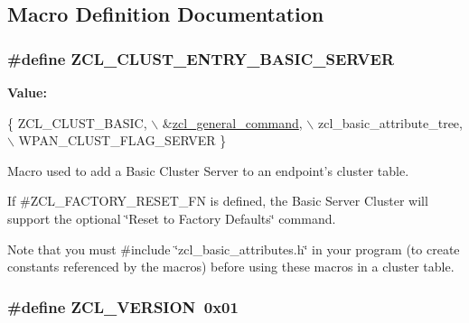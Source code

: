 \subsection{Macro Definition Documentation}
\hypertarget{group__zcl__basic_gad8336fcfc2729c8deb86eda7f125f271}{
\subsubsection[{Z\-C\-L\-\_\-\-C\-L\-U\-S\-T\-\_\-\-E\-N\-T\-R\-Y\-\_\-\-B\-A\-S\-I\-C\-\_\-\-S\-E\-R\-V\-E\-R}]{\setlength{\rightskip}{0pt plus 5cm}\#define Z\-C\-L\-\_\-\-C\-L\-U\-S\-T\-\_\-\-E\-N\-T\-R\-Y\-\_\-\-B\-A\-S\-I\-C\-\_\-\-S\-E\-R\-V\-E\-R}}\label{group__zcl__basic_gad8336fcfc2729c8deb86eda7f125f271}
{\bfseries Value\-:}
\begin{DoxyCode}
\{ ZCL\_CLUST\_BASIC,                  \(\backslash\)
         &\hyperlink{group__zcl_gac3849121e93e777ce9a7510d24517b9b}{zcl\_general\_command},           \(\backslash\)
         zcl\_basic\_attribute\_tree,        \(\backslash\)
         WPAN\_CLUST\_FLAG\_SERVER \}
\end{DoxyCode}


Macro used to add a Basic Cluster Server to an endpoint's cluster table. 

If \#\-Z\-C\-L\-\_\-\-F\-A\-C\-T\-O\-R\-Y\-\_\-\-R\-E\-S\-E\-T\-\_\-\-F\-N is defined, the Basic Server Cluster will support the optional \char`\"{}\-Reset to Factory Defaults\char`\"{} command.

Note that you must \#include \char`\"{}zcl\-\_\-basic\-\_\-attributes.\-h\char`\"{} in your program (to create constants referenced by the macros) before using these macros in a cluster table. \hypertarget{group__zcl__basic_ga677e87e13981dedcd3b370ede4902c54}{
\subsubsection[{Z\-C\-L\-\_\-\-V\-E\-R\-S\-I\-O\-N}]{\setlength{\rightskip}{0pt plus 5cm}\#define Z\-C\-L\-\_\-\-V\-E\-R\-S\-I\-O\-N~0x01}}\label{group__zcl__basic_ga677e87e13981dedcd3b370ede4902c54}


